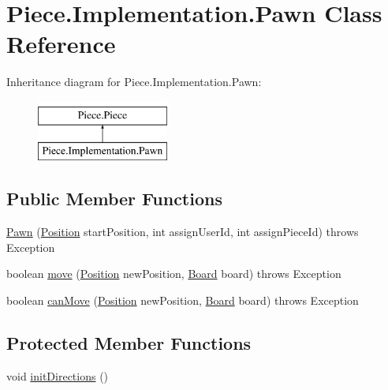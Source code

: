 \hypertarget{classPiece_1_1Implementation_1_1Pawn}{\section{Piece.\-Implementation.\-Pawn Class Reference}
\label{classPiece_1_1Implementation_1_1Pawn}
}
Inheritance diagram for Piece.\-Implementation.\-Pawn\-:\begin{figure}[H]
\begin{center}
\leavevmode
\includegraphics[height=2.000000cm]{classPiece_1_1Implementation_1_1Pawn}
\end{center}
\end{figure}
\subsection*{Public Member Functions}
\begin{DoxyCompactItemize}
\item 
\hyperlink{classPiece_1_1Implementation_1_1Pawn_aa8ed50a38f542bedfbb2b593ec8d28e7}{Pawn} (\hyperlink{classUtil_1_1Position}{Position} start\-Position, int assign\-User\-Id, int assign\-Piece\-Id)  throws Exception 
\item 
boolean \hyperlink{classPiece_1_1Implementation_1_1Pawn_a81011c0564bcf4d1931eb0e11eb7d7e8}{move} (\hyperlink{classUtil_1_1Position}{Position} new\-Position, \hyperlink{classBoard_1_1Board}{Board} board)  throws Exception 
\item 
boolean \hyperlink{classPiece_1_1Implementation_1_1Pawn_aaf6b3635a8fa5c0243223dbc065c4ad3}{can\-Move} (\hyperlink{classUtil_1_1Position}{Position} new\-Position, \hyperlink{classBoard_1_1Board}{Board} board)  throws Exception 
\end{DoxyCompactItemize}
\subsection*{Protected Member Functions}
\begin{DoxyCompactItemize}
\item 
void \hyperlink{classPiece_1_1Implementation_1_1Pawn_abe53393d31e868047a99adc17ffe50f6}{init\-Directions} ()
\end{DoxyCompactItemize}
